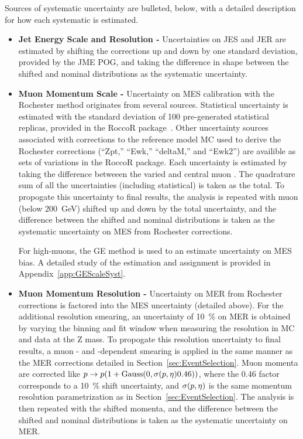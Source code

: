 Sources of systematic uncertainty are bulleted, below, with a detailed description for how each systematic is estimated.

\begin{itemize}
\item \textbf{Jet Energy Scale and Resolution - }
Uncertainties on JES and JER are estimated by shifting the corrections up and down by one standard deviation, provided by the JME POG, and taking the difference in shape between the shifted and nominal distributions as the systematic uncertainty.

\item \textbf{Muon Momentum Scale - }
Uncertainty on MES calibration with the Rochester method originates from several sources. Statistical uncertainty is estimated with the standard deviation of 100 pre-generated statistical replicas, provided in the RoccoR package~\cite{RoccoR}. Other uncertainty sources associated with corrections to the reference model MC used to derive the Rochester corrections (``Zpt,'' ``Ewk,'' ``deltaM,'' and ``Ewk2'') are availible as sets of variations in the RoccoR package. Each uncertainty is estimated by taking the difference betweeen the varied and central muon \pt. The quadrature sum of all the uncertainties (including statistical) is taken as the total. To propogate this uncertainty to final results, the analysis is repeated with muon \pt (below \SI{200}{\GeV}) shifted up and down by the total uncertainty, and the difference between the shifted and nominal distributions is taken as the systematic uncertainty on MES from Rochester corrections.

For high-\pt muons, the GE method is used to an estimate uncertainty on MES bias. A detailed study of the estimation and assignment is provided in Appendix~\ref{app:GEScaleSyst}. 


\item \textbf{Muon Momentum Resolution - }
Uncertainty on MER from Rochester corrections is factored into the MES uncertainty (detailed above). For the additional resolution smearing, an uncertainty of \SI{10}{\%} on MER is obtained by varying the binning and fit window when measuring the resolution in MC and data at the Z mass. To propogate this resolution uncertainty to final results, a muon \mom- and \pseudorap-dependent smearing is applied in the same manner as the MER corrections detailed in Section~\ref{sec:EventSelection}. Muon momenta are corrected like $p \rightarrow p(1 + \mathrm{Gauss}(0, \sigma(p,\eta)0.46))$, where the 0.46 factor corresponds to a \SI{10}{\%} shift uncertainty, and $\sigma(p,\eta)$ is the same momentum resolution parametrization as in Section~\ref{sec:EventSelection}. The analysis is then repeated with the shifted momenta, and the difference between the shifted and nominal distributions is taken as the systematic uncertainty on MER.


\end{itemize}
